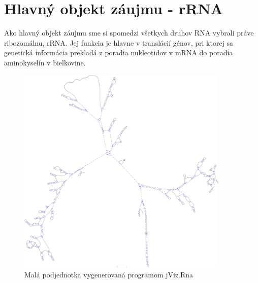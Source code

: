 \section{Hlavný objekt záujmu - rRNA}

Ako hlavný objekt záujmu sme si spomedzi všetkych druhov RNA vybrali práve ribozomálnu, rRNA.
Jej funkcia je hlavne v translácií génov, pri ktorej sa genetická informácia prekladá
z poradia nukleotidov v mRNA do poradia aminokyselín v bielkovine.

\begin{figure}[H]
  \centering
  \includegraphics[width=0.9\textwidth]{../img/human_jviz}
  \caption{Malá podjednotka vygenerovaná programom jViz.Rna }
  \label{obr:human_jviz}
\end{figure}

